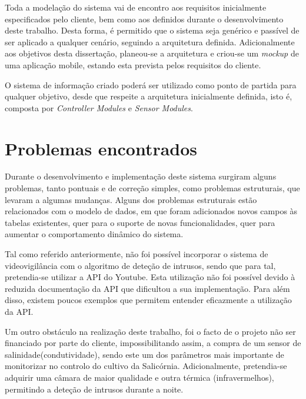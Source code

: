 Toda a modelação do sistema vai de encontro aos requisitos inicialmente especificados pelo cliente, bem como aos definidos durante o desenvolvimento deste trabalho. Desta forma, é permitido que o sistema seja genérico e passível de ser aplicado a qualquer cenário, seguindo a arquitetura definida. Adicionalmente aos objetivos desta dissertação, planeou-se a arquitetura e criou-se um \textit{mockup} de uma aplicação mobile, estando esta prevista pelos requisitos do cliente. 


O sistema de informação criado poderá ser utilizado como ponto de partida para qualquer objetivo, desde que respeite a arquitetura inicialmente definida, isto é, composta por \textit{Controller Modules} e \textit{Sensor Modules}. 



\section{Problemas encontrados}


Durante o desenvolvimento e implementação deste sistema surgiram alguns problemas, tanto pontuais e de correção simples, como
problemas estruturais, que levaram a algumas mudanças. Alguns dos problemas estruturais estão relacionados com o modelo de dados, em que foram adicionados novos campos às tabelas existentes, quer para o suporte de novas funcionalidades, quer para aumentar o comportamento dinâmico do sistema.


Tal como referido anteriormente, não foi possível incorporar o sistema de videovigilância com o algoritmo de deteção de intrusos, sendo que para tal, pretendia-se utilizar a \ac{API} do Youtube. Esta utilização não foi possível devido à reduzida documentação da API que dificultou a sua implementação. Para além disso, existem poucos exemplos que permitem entender eficazmente a utilização da API. 

Um outro obstáculo na realização deste trabalho, foi o facto de o projeto não ser financiado por parte do cliente, impossibilitando assim, a compra de um sensor de salinidade(condutividade), sendo este um dos parâmetros mais importante de monitorizar no controlo do cultivo da Salicórnia. Adicionalmente, pretendia-se adquirir uma câmara de maior qualidade e outra térmica (infravermelhos), permitindo a deteção de intrusos durante a noite. 






